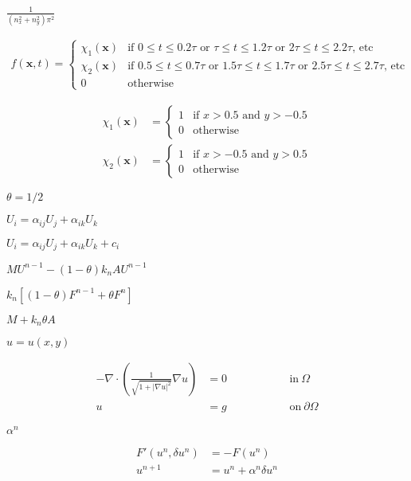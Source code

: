\documentclass{article}
\begin{document}
$\frac{1}{(n_x^2+n_y^2)\pi^2}$
\pagebreak

\begin{align*} f(\mathbf x, t) = \left\{ \begin{array}{ll} \chi_1(\mathbf x) & \text{if \(0\le t \le 0.2\tau\) or \(\tau\le t \le 1.2\tau\) or \(2\tau\le t \le 2.2\tau\), etc} \\ \chi_2(\mathbf x) & \text{if \(0.5\le t \le 0.7\tau\) or \(1.5\tau\le t \le 1.7\tau\) or \(2.5\tau\le t \le 2.7\tau\), etc} \\ 0 & \text{otherwise} \end{array} \right. \end{align*}
\pagebreak

\begin{align*} \chi_1(\mathbf x) &= \left\{ \begin{array}{ll} 1 & \text{if \(x>0.5\) and \(y>-0.5\)} \\ 0 & \text{otherwise} \end{array} \right. \\ \chi_2(\mathbf x) &= \left\{ \begin{array}{ll} 1 & \text{if \(x>-0.5\) and \(y>0.5\)} \\ 0 & \text{otherwise} \end{array} \right. \end{align*}
\pagebreak

$\theta=1/2$
\pagebreak

$U_i = \alpha_{ij} U_j + \alpha_{ik} U_k$
\pagebreak

$U_i = \alpha_{ij} U_j + \alpha_{ik} U_k + c_i$
\pagebreak

$MU^{n-1}-(1-\theta)k_n AU^{n-1}$
\pagebreak

$k_n \left[ (1-\theta)F^{n-1} + \theta F^n \right]$
\pagebreak

$M+k_n\theta A$
\pagebreak

$u=u(x,y)$
\pagebreak

\begin{align*} -\nabla \cdot \left( \frac{1}{\sqrt{1+|\nabla u|^{2}}}\nabla u \right) &= 0 \qquad \qquad &&\textrm{in} ~ \Omega \\ u&=g \qquad\qquad &&\textrm{on} ~ \partial \Omega \end{align*}
\pagebreak

$\alpha^n$
\pagebreak

\begin{align*} F'(u^{n},\delta u^{n})&=- F(u^{n}) \\ u^{n+1}&=u^{n}+\alpha^n \delta u^{n} \end{align*}
\pagebreak
\end{document}
